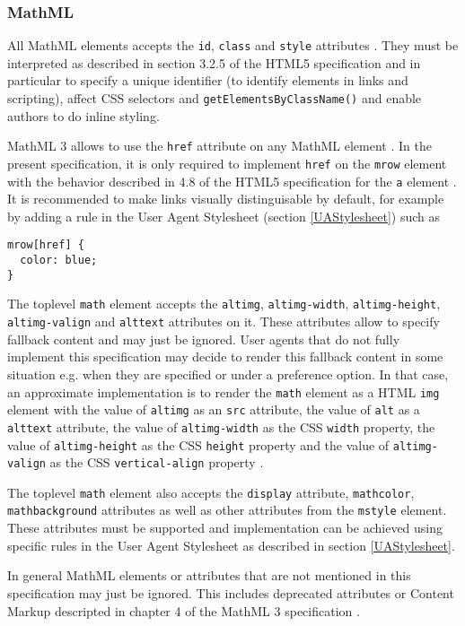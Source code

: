 \subsubsection{MathML}

All MathML elements accepts the {\tt id}, {\tt class} and {\tt style} attributes
\cite{MathML3}.
They must be interpreted as described in section 3.2.5 of the
HTML5 specification \cite{HTML5} and in particular to specify a unique
identifier (to identify elements in links and scripting), affect CSS selectors
and {\tt getElementsByClassName()} and enable authors to do inline styling.

MathML 3 allows to use the {\tt href} attribute on any MathML element
\cite{MathML3}. In the present specification, it is only required to implement
{\tt href} on the {\tt mrow} element with the behavior described in 4.8
of the HTML5 specification for the {\tt a} element \cite{HTML5}. It is
recommended to make links visually distinguisable by default, for example by
adding a rule in the User Agent Stylesheet (section \ref{UAStylesheet}) such as
\begin{lstlisting}
mrow[href] {
  color: blue;
}
\end{lstlisting}

The toplevel {\tt math} element accepts the {\tt altimg}, {\tt altimg-width},
{\tt altimg-height}, {\tt altimg-valign} and {\tt alttext} attributes on it.
These attributes allow to specify fallback content and may just be ignored.
User agents that do not fully implement this specification may decide to
render this fallback content in some situation e.g. when they are specified or
under a preference option. In that case, an approximate implementation is to
render the {\tt math} element as a HTML {\tt img} element with the
value of {\tt altimg} as an {\tt src} attribute, the value of
{\tt alt} as a {\tt alttext} attribute, the value of {\tt altimg-width} as
the CSS {\tt width} property, the value of {\tt altimg-height} as
the CSS {\tt height} property and the value of {\tt altimg-valign} as
the CSS {\tt vertical-align} property \cite{HTML5} \cite{CSS2}.

The toplevel {\tt math} element also accepts the {\tt display} attribute,
{\tt mathcolor}, {\tt mathbackground} attributes as well as other attributes
from the {\tt mstyle} element. These attributes must be supported and
implementation can be achieved using specific rules in the User Agent Stylesheet
as described in section \ref{UAStylesheet}.

In general MathML elements or attributes that are not mentioned in this
specification may just be ignored. This includes deprecated attributes or
Content Markup descripted in chapter 4 of the MathML 3 specification
\cite{MathML3}.

